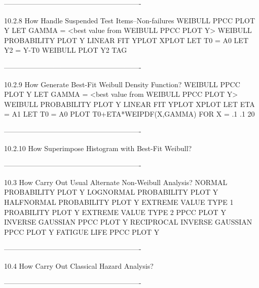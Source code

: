 ----------------------------------------------------------
 
10.2.8
How Handle Suspended Test Items--Non-failures
      WEIBULL PPCC PLOT Y
      LET GAMMA = <best value from WEIBULL PPCC PLOT Y>
      WEIBULL PROBABILITY PLOT Y
      LINEAR FIT YPLOT XPLOT
      LET T0 = A0
      LET Y2 = Y-T0
      WEIBULL PLOT Y2 TAG
 
----------------------------------------------------------
 
10.2.9
How Generate Best-Fit Weibull Density Function?
      WEIBULL PPCC PLOT Y
      LET GAMMA = <best value from WEIBULL PPCC PLOT Y>
      WEIBULL PROBABILITY PLOT Y
      LINEAR FIT YPLOT XPLOT
      LET ETA = A1
      LET T0 = A0
      PLOT T0+ETA*WEIPDF(X,GAMMA) FOR X = .1 .1 20
 
----------------------------------------------------------
 
10.2.10
How Superimpose Histogram with Best-Fit Weibull?
 
----------------------------------------------------------
 
10.3
How Carry Out Usual Alternate Non-Weibull Analysis?
      NORMAL PROBABILITY PLOT Y
      LOGNORMAL PROBABILITY PLOT Y
      HALFNORMAL PROBABILITY PLOT Y
      EXTREME VALUE TYPE 1 PROABILITY PLOT Y
      EXTREME VALUE TYPE 2 PPCC PLOT Y
      INVERSE GAUSSIAN PPCC PLOT Y
      RECIPROCAL INVERSE GAUSSIAN PPCC PLOT Y
      FATIGUE LIFE PPCC PLOT Y
 
----------------------------------------------------------
 
10.4
How Carry Out Classical Hazard Analysis?
 
----------------------------------------------------------
 
 
 
 
 
 
 
 
 
 
 
 
 
 
 
 
 
 
 
 
 
 
 
 
 
 
 
 
 
 
 
 
 
 
 
 
 
